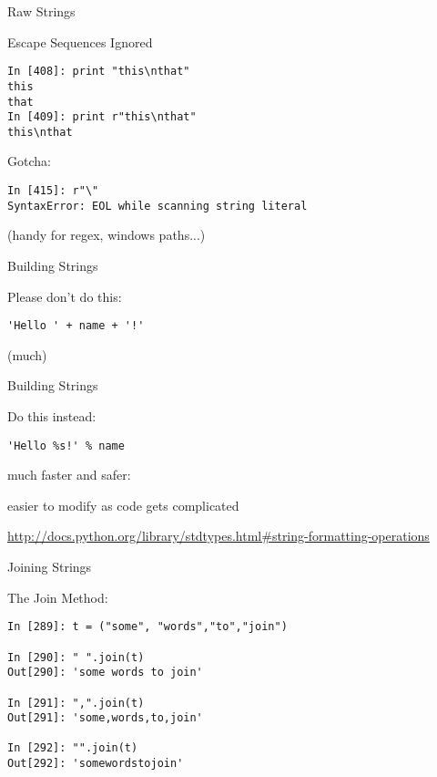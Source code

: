 \documentclass{beamer}
\begin{document}
\begin{frame}[fragile]{Raw Strings}

{\Large Escape Sequences Ignored}
\vfill
\begin{verbatim}
In [408]: print "this\nthat"
this
that
In [409]: print r"this\nthat"
this\nthat
\end{verbatim}

{\Large Gotcha:}
\begin{verbatim}
In [415]: r"\"
SyntaxError: EOL while scanning string literal
\end{verbatim}

\vfill
(handy for regex, windows paths...)
\end{frame} 


\begin{frame}[fragile]{Building Strings}

{\Large Please don't do this:

\vfill
\begin{verbatim}
'Hello ' + name + '!'
\end{verbatim}
}
\vfill
(much)

\end{frame} 

\begin{frame}[fragile]{Building Strings}

{\Large Do this instead:

\vfill
\begin{verbatim}
'Hello %s!' % name
\end{verbatim}

\vfill
much faster and safer:

\vfill
easier to modify as code gets complicated
}

\vfill
\url{http://docs.python.org/library/stdtypes.html#string-formatting-operations}
\end{frame} 

\begin{frame}[fragile]{Joining Strings}

{\Large The Join Method:}

\vfill
\begin{verbatim}
In [289]: t = ("some", "words","to","join")

In [290]: " ".join(t)
Out[290]: 'some words to join'

In [291]: ",".join(t)
Out[291]: 'some,words,to,join'

In [292]: "".join(t)
Out[292]: 'somewordstojoin'
\end{verbatim}

\end{frame} 
\end{document}
